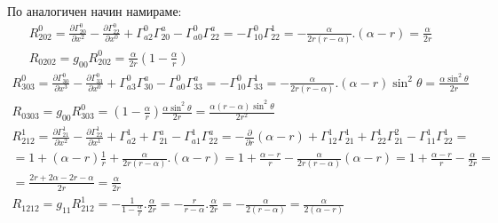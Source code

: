 \documentclass[a4paper,12pt]{article}
\begin{document}
    По аналогичен начин намираме:
    \begin{equation*}
        \begin{aligned}
            R^0_{202} = \frac{\partial\varGamma^0_{20}}{\partial x^2} - \frac{\partial\varGamma^0_{22}}{\partial x^0} + \varGamma^0_{a2}\varGamma^a_{20}-\varGamma^0_{a0}\varGamma^a_{22}
            = -\varGamma^0_{10}\varGamma^1_{22} = -\frac{\alpha}{2r(r-\alpha)}.(\alpha-r)=\frac{\alpha}{2r}
            \\
            R_{0202}=g_{00}R^0_{202} = \frac{\alpha}{2r}\left( 1-\frac{\alpha}{r} \right)
        \end{aligned}
    \end{equation*}
    \newline
    \begin{equation*}
        \begin{aligned}
            R^0_{303} = \frac{\partial \varGamma^0_{30}}{\partial x^3} - \frac{\partial\varGamma^0_{33}}{\partial x^0} + \varGamma^0_{a3}\varGamma^a_{30} - \varGamma^0_{a0}\varGamma^a_{33}
            = - \varGamma^0_ {10}\varGamma^1_{33} = -\frac{\alpha}{2r(r-\alpha)}.(\alpha-r)\sin^2\theta = \frac{\alpha\sin^2\theta}{2r}
            \\
            R_{0303}=g_{00}R^0_{303} = \left( 1- \frac{\alpha}{r} \right) \frac{\alpha\sin^2\theta}{2r} = \frac{\alpha(r-\alpha)\sin^2\theta}{2r^2}
        \end{aligned}
    \end{equation*}
    \newline
    \begin{equation*}
        \begin{aligned}
            R^1_{212} = \frac{\partial\varGamma^1_{21}}{\partial x^2} - \frac{\partial\varGamma^1_{22}}{\partial x^1} + \varGamma^1_{a2} + \varGamma^a_{21} - \varGamma^1_{a1}\varGamma^a_{22}
            = - \frac{\partial}{\partial r} (\alpha-r) + \varGamma^1_{12}\varGamma^1_{21}+\varGamma^1_{22}\varGamma^2_{21}-\varGamma^1_{11}\varGamma^1_{22} = \\
            =1 + (\alpha - r)\frac{1}{r}+\frac{\alpha}{2r(r-\alpha)}.(\alpha-r) = 1+\frac{\alpha-r}{r} - \frac{\alpha}{2r(r-\alpha)}(\alpha-r)=1+\frac{\alpha-r}{r}-\frac{\alpha}{2r} = \\
            = \frac{2r+2\alpha-2r-\alpha}{2r} = \frac{\alpha}{2r}
            \\
            R_{1212}=g_{11}R^1_{212}=-\frac{1}{1-\frac{\alpha}{r}}.\frac{\alpha}{2r}= - \frac{r}{r-\alpha}.\frac{\alpha}{2r}=-\frac{\alpha}{2(r-\alpha)} =\frac{\alpha}{2(\alpha-r)}
        \end{aligned}
    \end{equation*}
\end{document}
